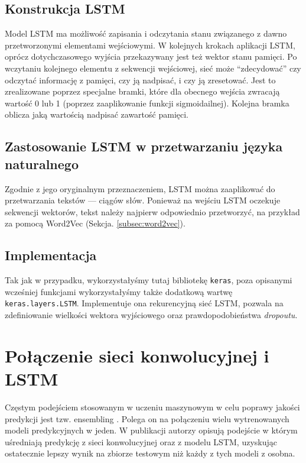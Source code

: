 \subsection{Konstrukcja LSTM}

Model LSTM ma możliwość zapisania i odczytania stanu związanego z dawno przetworzonymi elementami wejściowymi. W kolejnych krokach aplikacji LSTM, oprócz dotychczasowego wyjścia przekazywany jest też wektor stanu pamięci. Po wczytaniu kolejnego elementu z sekwencji wejściowej, sieć może “zdecydować” czy odczytać informację z pamięci, czy ją nadpisać, i czy ją zresetować. Jest to zrealizowane poprzez specjalne bramki, które dla obecnego wejścia zwracają wartość 0 lub 1 (poprzez zaaplikowanie funkcji sigmoidailnej). Kolejna bramka oblicza jaką wartością nadpisać zawartość pamięci.

\subsection{Zastosowanie LSTM w przetwarzaniu języka naturalnego}

Zgodnie z jego oryginalnym przeznaczeniem, LSTM można zaaplikować do przetwarzania tekstów --- ciągów słów. Ponieważ na wejściu LSTM oczekuje sekwencji wektorów, tekst należy najpierw odpowiednio przetworzyć, na przykład za pomocą Word2Vec (Sekcja. \ref{subsec:word2vec}).

\subsection{Implementacja}

Tak jak w przypadku, wykorzystałyśmy tutaj bibliotekę \verb_keras_, poza opisanymi wcześniej funkcjami wykorzystałyśmy także dodatkową wartwę \verb_keras.layers.LSTM_. Implementuje ona rekurencyjną sieć LSTM, pozwala na zdefiniowanie wielkości wektora wyjściowego oraz prawdopodobieństwa \textit{dropoutu}.

\section{Połączenie sieci konwolucyjnej i LSTM}
\label{sec:cnn-lstm}

Częstym podejściem stosowanym w uczeniu maszynowym w celu poprawy jakości predykcji jest tzw. ensembling \cite{opitz1999popular}. Polega on na połączeniu wielu wytrenowanych modeli predykcyjnych w jeden. W publikacji \cite{minaee2019deep} autorzy opisują podejście w którym uśredniają predykcję z sieci konwolucyjnej oraz z modelu LSTM, uzyskując ostatecznie lepszy wynik na zbiorze testowym niż każdy z tych modeli z osobna.


